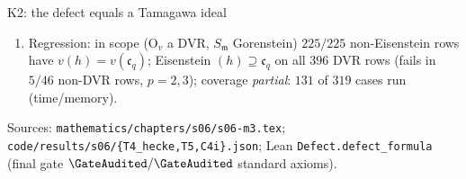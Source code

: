 \begin{frame}[shrink=6]{K2: the defect equals a Tamagawa ideal}
\begin{enumerate}
    \item[(C4(i))] Regression: in scope (O$_v$ a DVR, $S_{\mathfrak m}$ Gorenstein) $225/225$ non-Eisenstein rows have $v(h)=v(\mathfrak c_q)$; Eisenstein $(h)\supseteq\mathfrak c_q$ on all $396$ DVR rows (fails in $5/46$ non-DVR rows, $p=2,3$); coverage \emph{partial}: $131$ of $319$ cases run (time/memory).
  \end{enumerate}
  {\tiny Sources: \texttt{mathematics/chapters/s06/s06-m3.tex}; \texttt{code/results/s06/\{T4\_hecke,T5,C4i\}.json}; Lean \texttt{Defect.defect\_formula} (final gate $\GateAudited/\GateAudited$ standard axioms).}
\end{frame}
